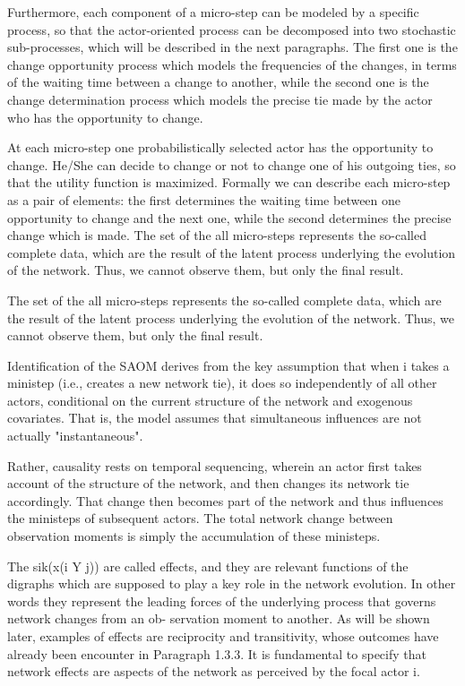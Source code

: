 Furthermore, each component of a micro-step can be modeled by a specific process, so that the actor-oriented process can be decomposed into two stochastic sub-processes, which will be described in the next paragraphs. The first one is the change opportunity process which models the frequencies of the changes, in terms of the waiting time between a change to another, while the second one is the change determination process which models the precise tie made by the actor who has the opportunity to change.

At each micro-step one probabilistically selected actor has the opportunity to change. He/She can decide to change or not to change one of his outgoing ties, so that the utility function is maximized. Formally we can describe each micro-step as a pair of elements: the first determines the waiting time between one opportunity to change and the next one, while the second determines the precise change which is made. The set of the all micro-steps represents the so-called complete data, which are the result of the latent process underlying the evolution of the network. Thus, we cannot observe them, but only the final result. 

The set of the all micro-steps represents the so-called complete data, which are the result of the latent process underlying the evolution of the network. Thus, we cannot observe them, but only the final result.

Identification of the SAOM derives from the key assumption that when i takes a ministep (i.e., creates a new network tie), it does so independently of all other actors, conditional on the current structure of the network and exogenous covariates. That is, the model assumes that simultaneous influences are not actually "instantaneous". 

Rather, causality rests on temporal sequencing, wherein an actor first takes account of the structure of the network, and then changes its network tie accordingly. That change then becomes part of the network and thus influences the ministeps of subsequent actors. The total network change between observation moments is simply the accumulation of these ministeps. 

The sik(x(i Y j)) are called effects, and they are relevant functions of the digraphs which are supposed to play a key role in the network evolution. In other words they represent the leading forces of the underlying process that governs network changes from an ob- servation moment to another. As will be shown later, examples of effects are reciprocity and transitivity, whose outcomes have already been encounter in Paragraph 1.3.3. It is fundamental to specify that network effects are aspects of the network as perceived by the focal actor i.

